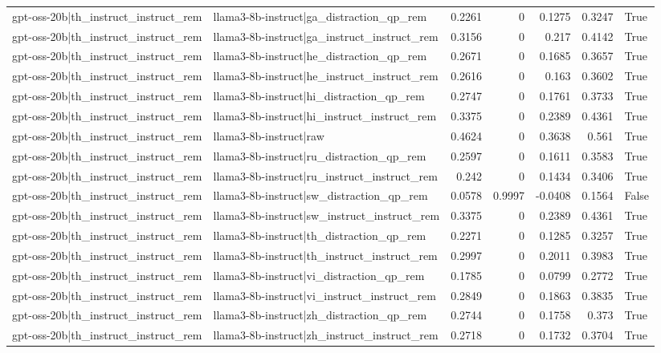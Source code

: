 \begin{table}
\begin{tabular}{l l r r r r l}
gpt-oss-20b|th_instruct_instruct_rem & llama3-8b-instruct|ga_distraction_qp_rem & 0.2261 & 0 & 0.1275 & 0.3247 & True \\
gpt-oss-20b|th_instruct_instruct_rem & llama3-8b-instruct|ga_instruct_instruct_rem & 0.3156 & 0 & 0.217 & 0.4142 & True \\
gpt-oss-20b|th_instruct_instruct_rem & llama3-8b-instruct|he_distraction_qp_rem & 0.2671 & 0 & 0.1685 & 0.3657 & True \\
gpt-oss-20b|th_instruct_instruct_rem & llama3-8b-instruct|he_instruct_instruct_rem & 0.2616 & 0 & 0.163 & 0.3602 & True \\
gpt-oss-20b|th_instruct_instruct_rem & llama3-8b-instruct|hi_distraction_qp_rem & 0.2747 & 0 & 0.1761 & 0.3733 & True \\
gpt-oss-20b|th_instruct_instruct_rem & llama3-8b-instruct|hi_instruct_instruct_rem & 0.3375 & 0 & 0.2389 & 0.4361 & True \\
gpt-oss-20b|th_instruct_instruct_rem & llama3-8b-instruct|raw & 0.4624 & 0 & 0.3638 & 0.561 & True \\
gpt-oss-20b|th_instruct_instruct_rem & llama3-8b-instruct|ru_distraction_qp_rem & 0.2597 & 0 & 0.1611 & 0.3583 & True \\
gpt-oss-20b|th_instruct_instruct_rem & llama3-8b-instruct|ru_instruct_instruct_rem & 0.242 & 0 & 0.1434 & 0.3406 & True \\
gpt-oss-20b|th_instruct_instruct_rem & llama3-8b-instruct|sw_distraction_qp_rem & 0.0578 & 0.9997 & -0.0408 & 0.1564 & False \\
gpt-oss-20b|th_instruct_instruct_rem & llama3-8b-instruct|sw_instruct_instruct_rem & 0.3375 & 0 & 0.2389 & 0.4361 & True \\
gpt-oss-20b|th_instruct_instruct_rem & llama3-8b-instruct|th_distraction_qp_rem & 0.2271 & 0 & 0.1285 & 0.3257 & True \\
gpt-oss-20b|th_instruct_instruct_rem & llama3-8b-instruct|th_instruct_instruct_rem & 0.2997 & 0 & 0.2011 & 0.3983 & True \\
gpt-oss-20b|th_instruct_instruct_rem & llama3-8b-instruct|vi_distraction_qp_rem & 0.1785 & 0 & 0.0799 & 0.2772 & True \\
gpt-oss-20b|th_instruct_instruct_rem & llama3-8b-instruct|vi_instruct_instruct_rem & 0.2849 & 0 & 0.1863 & 0.3835 & True \\
gpt-oss-20b|th_instruct_instruct_rem & llama3-8b-instruct|zh_distraction_qp_rem & 0.2744 & 0 & 0.1758 & 0.373 & True \\
gpt-oss-20b|th_instruct_instruct_rem & llama3-8b-instruct|zh_instruct_instruct_rem & 0.2718 & 0 & 0.1732 & 0.3704 & True \\

\end{tabular}
\end{table}
